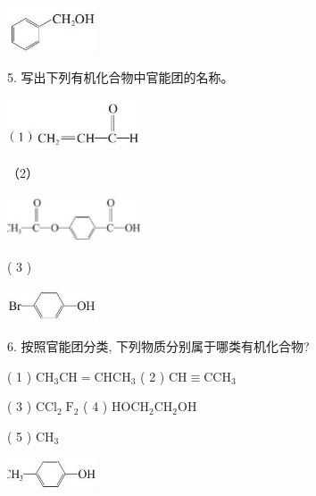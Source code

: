 \documentclass[10pt]{article}
\begin{document}
\begin{center}
\includegraphics[max width=0.2\textwidth]{images/0190efc5-b58a-7c43-bfb0-e0a030df9cfd_17_526189.jpg}
\end{center}

5. 写出下列有机化合物中官能团的名称。

\begin{center}
\includegraphics[max width=0.3\textwidth]{images/0190efc5-b58a-7c43-bfb0-e0a030df9cfd_17_693340.jpg}
\end{center}

（2）

\begin{center}
\includegraphics[max width=0.3\textwidth]{images/0190efc5-b58a-7c43-bfb0-e0a030df9cfd_17_188578.jpg}
\end{center}

( 3 )

\begin{center}
\includegraphics[max width=0.2\textwidth]{images/0190efc5-b58a-7c43-bfb0-e0a030df9cfd_17_244150.jpg}
\end{center}

6. 按照官能团分类, 下列物质分别属于哪类有机化合物?

( 1 ) \({\mathrm{{CH}}}_{3}\mathrm{{CH}} = {\mathrm{{CHCH}}}_{3}\) ( 2 ) \(\mathrm{{CH}} \equiv {\mathrm{{CCH}}}_{3}\)

( 3 ) \({\mathrm{{CCl}}}_{2}{\mathrm{\;F}}_{2}\) ( 4 ) \({\mathrm{{HOCH}}}_{2}{\mathrm{{CH}}}_{2}\mathrm{{OH}}\)

( 5 ) \({\mathrm{{CH}}}_{3}\)

\begin{center}
\includegraphics[max width=0.2\textwidth]{images/0190efc5-b58a-7c43-bfb0-e0a030df9cfd_17_215922.jpg}
\end{center}
\end{document}
